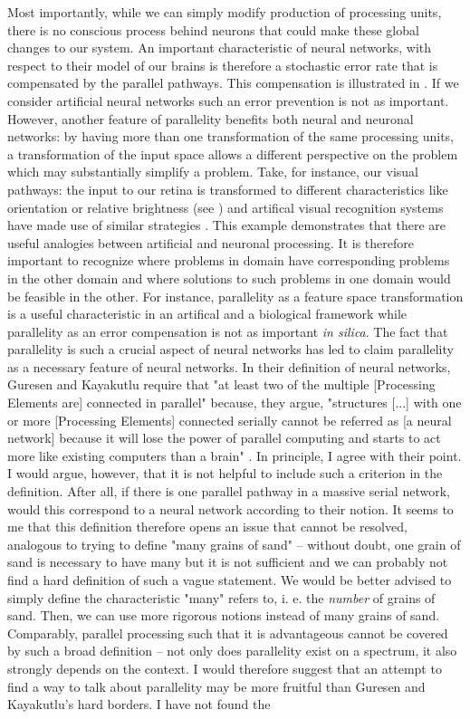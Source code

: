 \documentclass[a4paper,11pt]{article}
\begin{document}
Most importantly, while we can simply modify production of processing units, there is no conscious process behind neurons that could make these global changes to our system. An important characteristic of neural networks, with respect to their model of our brains is therefore a stochastic error rate that is compensated by the parallel pathways. This compensation is illustrated in \cite[][51]{Rojas1996}. If we consider artificial neural networks such an error prevention is not as important. However, another feature of parallelity benefits both neural and neuronal networks: by having more than one transformation of the same processing units, a transformation of the input space allows a different perspective on the problem which may substantially simplify a problem. Take, for instance, our visual pathways: the input to our retina is transformed to different characteristics like orientation or relative brightness (see \cite[][257-276]{Purves2012}) and artifical visual recognition systems have made use of similar strategies \cite[][70-73]{Rojas1996}. This example demonstrates that there are useful analogies between artificial and neuronal processing. It is therefore important to recognize where problems in domain have corresponding problems in the other domain and where solutions to such problems in one domain would be feasible in the other. For instance, parallelity as a feature space transformation is a useful characteristic in an artifical and a biological framework while parallelity as an error compensation is not as important \textit{in silica}. The fact that parallelity is such a crucial aspect of neural networks has led \cite{Guresen2011} to claim parallelity as a necessary feature of neural networks. In their definition of neural networks, Guresen and Kayakutlu require that "at least two of the multiple [Processing Elements are] connected in parallel" \cite[][428]{Guresen2011} because, they argue, "structures [...] with one or more [Processing Elements] connected serially cannot be referred as [a neural network] because it will lose the power of parallel computing and starts to act more like existing computers than a brain" \cite[][428]{Guresen2011}. In principle, I agree with their point. I would argue, however, that it is not helpful to include such a criterion in the definition. After all, if there is one parallel pathway in a massive serial network, would this correspond to a neural network according to their notion. It seems to me that this definition therefore opens an issue that cannot be resolved, analogous to trying to define "many grains of sand" -- without doubt, one grain of sand is necessary to have many but it is not sufficient and we can probably not find a hard definition of such a vague statement. We would be better advised to simply define the characteristic "many" refers to, i. e. the \emph{number} of grains of sand. Then, we can use more rigorous notions instead of many grains of sand. Comparably, parallel processing such that it is advantageous cannot be covered by such a broad definition -- not only does parallelity exist on a spectrum, it also strongly depends on the context. I would therefore suggest that an attempt to find a way to talk about parallelity may be more fruitful than Guresen and Kayakutlu's hard borders. I have not found the 
\end{document}
